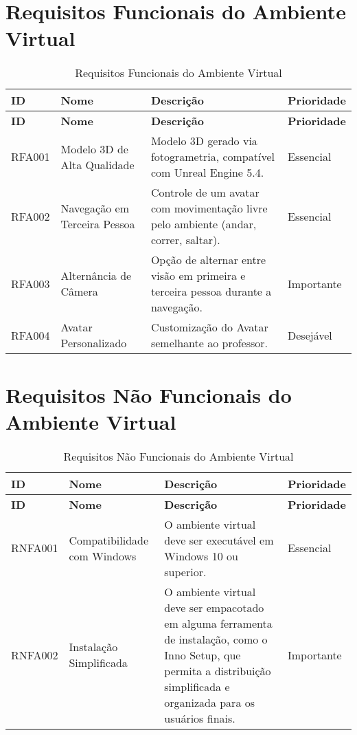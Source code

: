 
\section{Requisitos Funcionais do Ambiente Virtual}\label{ap:requisitos-ambiente-table}
\begin{longtable}{|l|l|p{6cm}|l|}
    \caption{Requisitos Funcionais do Ambiente Virtual}
    \label{tab:requisitos-funcionais-ambiente}
    \hline
    \textbf{ID} & \textbf{Nome} & \textbf{Descrição} & \textbf{Prioridade} \\ \hline
    \endfirsthead
    \hline
    \textbf{ID} & \textbf{Nome} & \textbf{Descrição} & \textbf{Prioridade} \\ \hline
    \endhead
    RFA001 & Modelo 3D de Alta Qualidade & Modelo 3D gerado via fotogrametria, compatível com Unreal Engine 5.4. & Essencial \\ \hline
    RFA002 & Navegação em Terceira Pessoa & Controle de um avatar com movimentação livre pelo ambiente (andar, correr, saltar). & Essencial \\ \hline
    RFA003 & Alternância de Câmera & Opção de alternar entre visão em primeira e terceira pessoa durante a navegação. & Importante \\ \hline
    RFA004 & Avatar Personalizado & Customização do Avatar semelhante ao professor. & Desejável \\ \hline
\end{longtable}

\section{Requisitos Não Funcionais do Ambiente Virtual}\label{ap:requisitos-nao-funcionais-ambiente}
\begin{longtable}{|l|l|p{6cm}|l|}
    \caption{Requisitos Não Funcionais do Ambiente Virtual}
    \label{tab:requisitos-nao-funcionais-ambiente}
    \hline
    \textbf{ID} & \textbf{Nome} & \textbf{Descrição} & \textbf{Prioridade} \\ \hline
    \endfirsthead
    \hline
    \textbf{ID} & \textbf{Nome} & \textbf{Descrição} & \textbf{Prioridade} \\ \hline
    \endhead
    RNFA001 & Compatibilidade com Windows & O ambiente virtual deve ser executável em Windows 10 ou superior. & Essencial \\ \hline
    RNFA002 & Instalação Simplificada & O ambiente virtual deve ser empacotado em alguma ferramenta de instalação, como o Inno Setup, que permita a distribuição simplificada e organizada para os usuários finais. & Importante \\ \hline
\end{longtable}